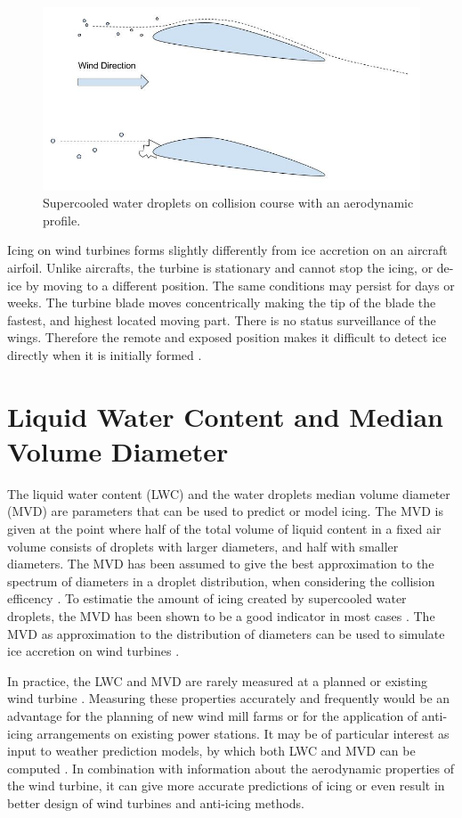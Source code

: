 \begin{figure}%
\centering\includegraphics[width=0.8\linewidth]{./figures/freezing_droplets.jpg}
\caption{Supercooled water droplets on collision course with an aerodynamic profile.}
\label{fig:freezedrops}
\end{figure}

Icing on wind turbines forms slightly differently from ice accretion on an aircraft airfoil. Unlike aircrafts, the turbine is stationary and cannot stop the icing, or de-ice by moving to a different position. The same conditions may persist for days or weeks. The turbine blade moves concentrically making the tip of the blade the fastest, and highest located moving part. There is no status surveillance of the wings. Therefore the remote and exposed position makes it difficult to detect ice directly when it is initially formed \cite{homo2006}.

\section{Liquid Water Content and Median Volume Diameter}

The liquid water content (LWC) and the water droplets median volume diameter (MVD) are parameters that can be used to predict or model icing. The  MVD is given at the point where half of the total volume of liquid content in a fixed air volume consists of droplets with larger diameters, and half with smaller diameters. The MVD has been assumed to give the best approximation to the spectrum of diameters in a droplet distribution, when considering the collision efficency \cite{fins1988}. To estimatie the amount of icing created by supercooled water droplets, the MVD has been shown to be a good indicator in most cases \cite{makk2000}. The MVD as approximation to the distribution of diameters can be used to simulate ice accretion on wind turbines \cite{dier2011}.

In practice, the LWC and MVD are rarely measured at a planned or existing wind turbine \cite{parent2011, makk1992}. Measuring these properties accurately and frequently would be an advantage for the planning of new wind mill farms or for the application of anti-icing arrangements on existing power stations. It may be of particular interest as input to weather prediction models, by which both LWC and MVD can be computed \cite{thomp2009, nyga2011}. In combination with information about the aerodynamic properties of the wind turbine, it can give more accurate predictions of icing or even result in better design of wind turbines and anti-icing methods.

